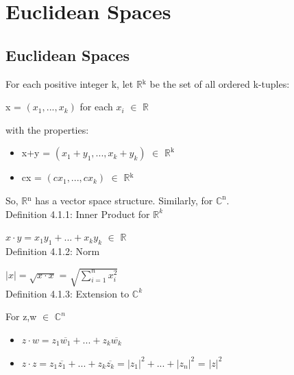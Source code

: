 \newpage
\section[Day 4: Cauchy-Schwarz and Euclidean Spaces]{Euclidean Spaces}





\subsection{Euclidean Spaces}

	For each positive integer k, let $\mathbb{R}$$^\text{k}$ be the set of all ordered k-tuples:

	\qquad x = $(x_1,...,x_k)$	\qquad \qquad for each $x_i$ $\in$ $\mathbb{R}$

	with the properties:
	\begin{itemize}[leftmargin=1cm]
		\item x+y = $(x_1+y_1,...,x_k+y_k)$ $\in$ $\mathbb{R}^{\text{k}}$
	
		\item cx = $(cx_1,...,cx_k)$ $\in$ $\mathbb{R}$$^\text{k}$
	\end{itemize}

	So, $\mathbb{R}$$^\text{n}$ has a vector space structure. Similarly, for $\mathbb{C}^{\text{n}}$. \\


{ \color{blue} Definition 4.1.1: Inner Product for $\mathbb{R}^k$} 

	\qquad $x \cdot y = x_1y_1 + ... + x_ky_k$ $\in$ $\mathbb{R}$ \\

{ \color{blue} Definition 4.1.2: Norm }

	\qquad $|x| = \sqrt{x \cdot x}$ = $\sqrt{\sum_{i=1}^n x_i^2}$ \\

{ \color{blue} Definition 4.1.3: Extension to $\mathbb{C}^k$ } 

	\qquad For z,w $\in$ $\mathbb{C}^n$
	\begin{itemize}[leftmargin=2cm]
		\item $z \cdot w = z_1\overline{w_1} + ... + z_k\overline{w_k}$
	
		\item $z \cdot z = z_1\overline{z_1} + ... + z_k\overline{z_k}
			= |z_1|^2 + ... + |z_n|^2$ = $|z|^2$
	\end{itemize}





